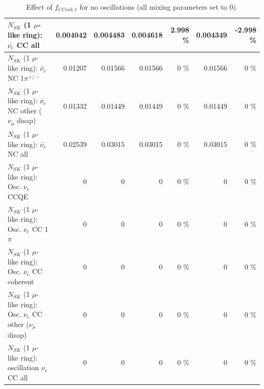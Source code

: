 \begin{table}
\begin{tabular}{| l | r | r | r  r | r  r |}
                            $N_{SK}$ (1 $\mu$-like ring): $\bar{\nu_{e}}$ CC all &        0.004042 &        0.004483 &        0.004618 &    2.998 \%  &        0.004349 &   -2.998 \%  \\ 
\hline
                     $N_{SK}$ (1 $\mu$-like ring): $\bar{\nu_e}$ NC 1$\pi^{+/-}$ &         0.01207 &         0.01566 &         0.01566 &        0 \%  &         0.01566 &        0 \%  \\ 
          $N_{SK}$ (1 $\mu$-like ring): $\bar{\nu_e}$ NC other ($\nu_\mu$ disap) &         0.01332 &         0.01449 &         0.01449 &        0 \%  &         0.01449 &        0 \%  \\ 
                            $N_{SK}$ (1 $\mu$-like ring): $\bar{\nu_{e}}$ NC all &         0.02539 &         0.03015 &         0.03015 &        0 \%  &         0.03015 &        0 \%  \\ 
\hline
\hline
\hline
                                 $N_{SK}$ (1 $\mu$-like ring): Osc. $\nu_e$ CCQE &               0 &               0 &               0 &        0 \%  &               0 &        0 \%  \\ 
                            $N_{SK}$ (1 $\mu$-like ring): Osc. $\nu_e$ CC 1$\pi$ &               0 &               0 &               0 &        0 \%  &               0 &        0 \%  \\ 
                          $N_{SK}$ (1 $\mu$-like ring): Osc. $\nu_e$ CC coherent &               0 &               0 &               0 &        0 \%  &               0 &        0 \%  \\ 
           $N_{SK}$ (1 $\mu$-like ring): Osc. $\nu_e$ CC other ($\nu_\mu$ disap) &               0 &               0 &               0 &        0 \%  &               0 &        0 \%  \\ 
                        $N_{SK}$ (1 $\mu$-like ring): oscillation $\nu_e$ CC all &               0 &               0 &               0 &        0 \%  &               0 &        0 \%  \\ 
\hline
\hline
\end{tabular}
\caption{ Effect of $f_{CCcoh; t}$ for no oscillations (all mixing parameters set to 0). }
\label{tab:num_xsec_norm_cccoh_1RmuT_3f_osc_t13:0}
\end{table}
\clearpage
